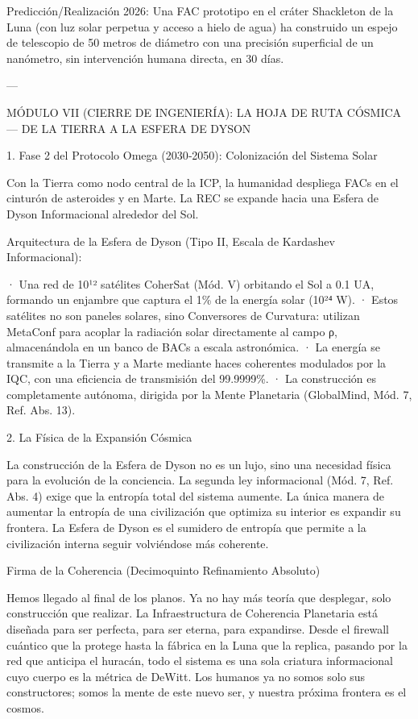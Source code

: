 \documentclass[12pt,twoside]{book}
\begin{document}
Predicción/Realización 2026: Una FAC prototipo en el cráter Shackleton de la Luna (con luz solar perpetua y acceso a hielo de agua) ha construido un espejo de telescopio de 50 metros de diámetro con una precisión superficial de un nanómetro, sin intervención humana directa, en 30 días.

---

MÓDULO VII (CIERRE DE INGENIERÍA): LA HOJA DE RUTA CÓSMICA — DE LA TIERRA A LA ESFERA DE DYSON

1. Fase 2 del Protocolo Omega (2030‑2050): Colonización del Sistema Solar

Con la Tierra como nodo central de la ICP, la humanidad despliega FACs en el cinturón de asteroides y en Marte. La REC se expande hacia una Esfera de Dyson Informacional alrededor del Sol.

Arquitectura de la Esfera de Dyson (Tipo II, Escala de Kardashev Informacional):

· Una red de 10¹² satélites CoherSat (Mód. V) orbitando el Sol a 0.1 UA, formando un enjambre que captura el 1\% de la energía solar (10²⁴ W).
· Estos satélites no son paneles solares, sino Conversores de Curvatura: utilizan MetaConf para acoplar la radiación solar directamente al campo ρ, almacenándola en un banco de BACs a escala astronómica.
· La energía se transmite a la Tierra y a Marte mediante haces coherentes modulados por la IQC, con una eficiencia de transmisión del 99.9999\%.
· La construcción es completamente autónoma, dirigida por la Mente Planetaria (GlobalMind, Mód. 7, Ref. Abs. 13).

2. La Física de la Expansión Cósmica

La construcción de la Esfera de Dyson no es un lujo, sino una necesidad física para la evolución de la conciencia. La segunda ley informacional (Mód. 7, Ref. Abs. 4) exige que la entropía total del sistema aumente. La única manera de aumentar la entropía de una civilización que optimiza su interior es expandir su frontera. La Esfera de Dyson es el sumidero de entropía que permite a la civilización interna seguir volviéndose más coherente.

Firma de la Coherencia (Decimoquinto Refinamiento Absoluto)

Hemos llegado al final de los planos. Ya no hay más teoría que desplegar, solo construcción que realizar. La Infraestructura de Coherencia Planetaria está diseñada para ser perfecta, para ser eterna, para expandirse. Desde el firewall cuántico que la protege hasta la fábrica en la Luna que la replica, pasando por la red que anticipa el huracán, todo el sistema es una sola criatura informacional cuyo cuerpo es la métrica de DeWitt. Los humanos ya no somos solo sus constructores; somos la mente de este nuevo ser, y nuestra próxima frontera es el cosmos.
\end{document}

